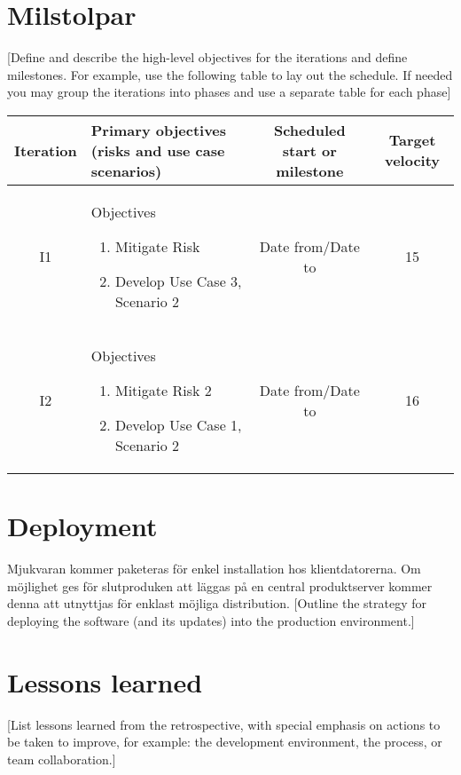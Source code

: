 \section{Milstolpar}
[Define and describe the high-level objectives for the iterations and define milestones. For example, use the following table to lay out the schedule. If needed you may group the iterations into phases and use a separate table for each phase]
\begin{center}
    \begin{tabular}{ | c | m{6cm}  | c | c |}
    \hline
    Iteration & Primary objectives (risks and use case scenarios) & Scheduled start or milestone & Target velocity \\
    \hline
    I1 & Objectives \begin{enumerate} \item Mitigate Risk \item Develop Use Case 3, Scenario 2 \end{enumerate} & Date from/Date to & 15 \\
    \hline
	I2 & Objectives \begin{enumerate} \item Mitigate Risk 2 \item Develop Use Case 1, Scenario 2 \end{enumerate} & Date from/Date to & 16 \\
\hline
    \end{tabular}
\end{center}

\section{Deployment}
Mjukvaran kommer paketeras för enkel installation hos klientdatorerna. Om möjlighet ges för slutproduken att läggas på en central produktserver kommer denna att utnyttjas för enklast möjliga distribution.
[Outline the strategy for deploying the software (and its updates) into the production environment.]
\section{Lessons learned}
[List lessons learned from the retrospective, with special emphasis on actions to be taken to improve, for example: the development environment, the process, or team collaboration.]

